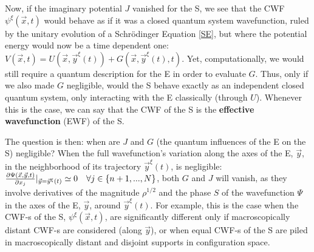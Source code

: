 \documentclass[11pt, a4paper]{article} %
\begin{document}


Now, if the imaginary potential $J$ vanished for the S, we see that the CWF $\psi^\xi(\vec{x},t)$ would behave as if it was a closed quantum system wavefunction, ruled by the unitary evolution of a Schrödinger Equation \eqref{SE}, but where the potential energy would now be a time dependent one: $V(\vec{x},t)=U(\vec{x},\vec{y}^\xi(t))+G(\vec{x},\vec{y}^\xi(t),t)$. Yet, computationally, we would still require a quantum description for the E in order to evaluate $G$. Thus, only if we also made $G$ negligible, would the S behave exactly as an independent closed quantum system, only interacting with the E classically (through $U$). Whenever this is the case, we can say that the CWF of the S is the {\bf effective wavefunction} (EWF) of the S. 

The question is then: when are $J$ and $G$ (the quantum influences of the E on the S) negligible? When the full wavefunction's variation along the axes of the E, $\vec{y}$, in the neighborhood of its trajectory $\vec{y}^\xi(t)$, is negligible: $\pdv{\Psi(\vec{x},\vec{y},t)}{x_j}\rvert_{\vec{y}=\vec{y}^\xi(t)}\simeq 0  \quad \forall j\in\{n+1,...,N\}$, both $G$ and $J$ will vanish, as they involve derivatives of the magnitude $\rho^{1/2}$ and the phase $S$ of the wavefunction $\Psi$ in the axes of the E, $\vec{y}$, around $\vec{y}^\xi(t)$. For example, this is the case when the CWF-s of the S, $\psi^\xi(\vec{x},t)$, are significantly different only if macroscopically distant CWF-s are considered (along $\vec{y}$), or when equal CWF-s of the S are piled in macroscopically distant and disjoint supports in configuration space.
\end{document}
